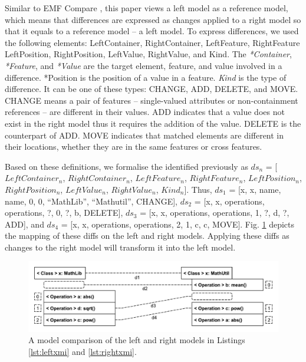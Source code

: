 \documentclass{llncs}
\begin{document}
Similar to EMF Compare \cite{emfcompare2018developer}, this paper views a left model as a reference model, which means that differences are expressed as changes applied to a right model so that it equals to a reference model -- a left model. To express differences, we used the following elements: \textsf{LeftContainer}, \textsf{RightContainer}, \textsf{LeftFeature}, \textsf{RightFeature} \textsf{LeftPosition}, \textsf{RightPosition}, \textsf{LeftValue}, \textsf{RightValue}, and \textsf{Kind}. The \textit{*Container}, \textit{*Feature}, and \textit{*Value} are the target element, feature, and value involved in a difference. \textsf{*Position} is the position of a value in a feature. \textit{Kind} is the type of difference. It can be one of these types: \textsf{CHANGE}, \textsf{ADD}, \textsf{DELETE}, and \textsf{MOVE}. \textsf{CHANGE} means a pair of features -- single-valued attributes or non-containment references -- are different in their values. \textsf{ADD} indicates that a value does not exist in the right model thus it requires the addition of the value. \textsf{DELETE} is the counterpart of \textsf{ADD}. \textsf{MOVE} indicates that matched elements are different in their locations, whether they are in the same features or cross features. 
    
Based on these definitions, we formalise the identified previously as $ds_{n}$ = [$LeftContainer_n$, $RightContainer_n$, $LeftFeature_n$, $RightFeature_n$, $LeftPosition_n$, $RightPosition_n$, $LeftValue_n$, $RightValue_n$, $Kind_n$]. Thus, $ds_{1}$ =  [\textsf{x}, \textsf{x}, \textsf{name}, \textsf{name}, 0, 0, ``MathLib'', ``Mathutil'', \textsf{CHANGE}], $ds_{2}$ = [\textsf{x}, \textsf{x}, \textsf{operations}, \textsf{operations}, ?, 0, ?, \textsf{b}, \textsf{DELETE}], $ds_{3}$ = [\textsf{x}, \textsf{x}, \textsf{operations}, \textsf{operations}, 1, ?, \textsf{d}, ?, \textsf{ADD}], and $ds_{4}$ = [\textsf{x}, \textsf{x}, \textsf{operations}, \textsf{operations}, 2, 1, \textsf{c}, \textsf{c}, \textsf{MOVE}]. Fig. \ref{fig:xmi_comparison} depicts the mapping of these diffs on the left and right models. Applying these diffs as changes to the right model will transform it into the left model.  

\vspace{-20pt}
 \begin{figure}
     \includegraphics[width=\linewidth]{images/XmiComparison}
     \caption{A model comparison of the left and right models in Listings \ref{lst:leftxmi} and \ref{lst:rightxmi}.}
     \label{fig:xmi_comparison}
 \end{figure}
 
\end{document}
